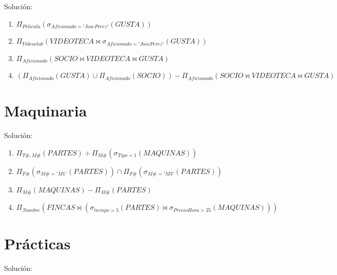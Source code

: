 \documentclass[a4paper]{article}
\begin{document}
Solución:

\begin{enumerate}
    \item $\Pi_{Pelicula} \left( \sigma_{Aficionado='Jose Perez'} \left( GUSTA \right) \right)$
    \item $\Pi_{Videoclub} \left( VIDEOTECA \bowtie \sigma_{Aficionado='Jose Perez'} \left( GUSTA \right) \right)$
    \item $\Pi_{Aficionado} \left( SOCIO \bowtie VIDEOTECA \bowtie GUSTA \right)$
    \item $\left( \Pi_{Aficionado} \left( GUSTA \right) \cup \Pi_{Aficionado} \left( SOCIO \right) \right) - \Pi_{Aficionado} \left( SOCIO \bowtie VIDEOTECA \bowtie GUSTA \right)$
\end{enumerate}

\section{Maquinaria}

Solución:

\begin{enumerate}
    \item $\Pi_{T\#,M\#} \left( PARTES \right) \div \Pi_{M\#} \left( \sigma_{Tipo=1} \left( MAQUINAS \right) \right)$
    \item $\Pi_{F\#} \left( \sigma_{M\#='M1'} \left( PARTES \right) \right) \cap \Pi_{F\#} \left( \sigma_{M\#='M3'} \left( PARTES \right) \right)$
    \item $\Pi_{M\#} \left( MAQUINAS \right) - \Pi_{M\#} \left( PARTES \right)$
    \item $\Pi_{Nombre} \left( FINCAS \bowtie \left( \sigma_{tiempo>5} \left( PARTES \right) \bowtie \sigma_{PrecioHora>25} \left( MAQUINAS \right) \right) \right)$
\end{enumerate}

\section{Prácticas}

Solución:
\end{document}
